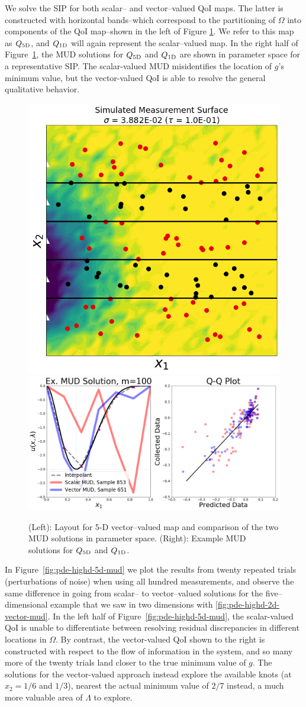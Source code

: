 We solve the SIP for both scalar-- and vector--valued QoI maps.
The latter is constructed with horizontal bands\---which correspond to the partitioning of $\Omega$ into components of the QoI map\---shown in the left of Figure \ref{fig:pde-highd-5d-example}.
We refer to this map as $Q_\text{5D}$, and $Q_\text{1D}$ will again represent the scalar--valued map.
In the right half of Figure~\ref{fig:pde-highd-5d-example}, the MUD solutions for $Q_\text{5D}$ and $Q_\text{1D}$ are shown in parameter space for a representative SIP.
The scalar-valued MUD misidentifies the location of $g$'s minimum value, but the vector-valued QoI is able to resolve the general qualitative behavior.

\begin{figure}
\centering
  \includegraphics[width=0.35\linewidth]{figures/pde-highd/pde-highd_sensors_D5}
  \includegraphics[width=0.6\linewidth]{figures/pde-highd/pde-highd_comp_exmud_D5_m100}
\caption{
(Left): Layout for 5-D vector--valued map and comparison of the two MUD solutions in parameter space.
(Right): Example MUD solutions for $Q_\text{5D}$ and $Q_\text{1D}$.
}
\label{fig:pde-highd-5d-example}
\end{figure}

In Figure~\ref{fig:pde-highd-5d-mud} we plot the results from twenty repeated trials (perturbations of noise) when using all hundred measurements, and observe the same difference in going from scalar-- to vector--valued solutions for the five--dimensional example that we saw in two dimensions with \ref{fig:pde-highd-2d-vector-mud}.
In the left half of Figure~\ref{fig:pde-highd-5d-mud}, the scalar-valued QoI is unable to differentiate between resolving residual discrepancies in different locations in $\Omega$.
By contrast, the vector-valued QoI shown to the right is constructed with respect to the flow of information in the system, and so many more of the twenty trials land closer to the true minimum value of $g$.
The solutions for the vector-valued approach instead explore the available knots (at $x_2=1/6$ and $1/3$), nearest the actual minimum value of $2/7$ instead, a much more valuable area of $\Lambda$ to explore.

